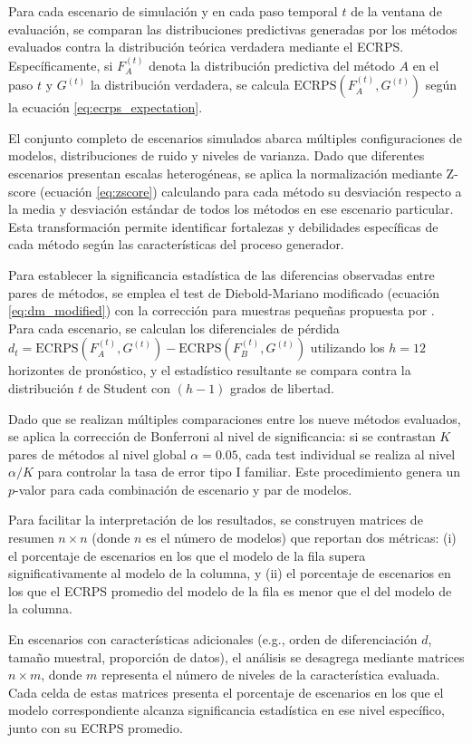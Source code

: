 Para cada escenario de simulación y en cada paso temporal $t$ de la ventana de evaluación, se comparan las distribuciones predictivas generadas por los métodos evaluados contra la distribución teórica verdadera mediante el ECRPS. Específicamente, si $F_A^{(t)}$ denota la distribución predictiva del método $A$ en el paso $t$ y $G^{(t)}$ la distribución verdadera, se calcula $\text{ECRPS}(F_A^{(t)}, G^{(t)})$ según la ecuación \eqref{eq:ecrps_expectation}.

El conjunto completo de escenarios simulados abarca múltiples configuraciones de modelos, distribuciones de ruido y niveles de varianza. Dado que diferentes escenarios presentan escalas heterogéneas, se aplica la normalización mediante Z-score (ecuación \eqref{eq:zscore}) calculando para cada método su desviación respecto a la media y desviación estándar de todos los métodos en ese escenario particular. Esta transformación permite identificar fortalezas y debilidades específicas de cada método según las características del proceso generador.

Para establecer la significancia estadística de las diferencias observadas entre pares de métodos, se emplea el test de Diebold-Mariano modificado (ecuación \eqref{eq:dm_modified}) con la corrección para muestras pequeñas propuesta por \textcite{Harvey1997}. Para cada escenario, se calculan los diferenciales de pérdida $d_t = \text{ECRPS}(F_A^{(t)}, G^{(t)}) - \text{ECRPS}(F_B^{(t)}, G^{(t)})$ utilizando los $h=12$ horizontes de pronóstico, y el estadístico resultante se compara contra la distribución $t$ de Student con $(h-1)$ grados de libertad.

Dado que se realizan múltiples comparaciones entre los nueve métodos evaluados, se aplica la corrección de Bonferroni al nivel de significancia: si se contrastan $K$ pares de métodos al nivel global $\alpha = 0.05$, cada test individual se realiza al nivel $\alpha/K$ para controlar la tasa de error tipo I familiar. Este procedimiento genera un $p$-valor para cada combinación de escenario y par de modelos.

Para facilitar la interpretación de los resultados, se construyen matrices de resumen $n \times n$ (donde $n$ es el número de modelos) que reportan dos métricas: (i) el porcentaje de escenarios en los que el modelo de la fila supera significativamente al modelo de la columna, y (ii) el porcentaje de escenarios en los que el ECRPS promedio del modelo de la fila es menor que el del modelo de la columna. 

En escenarios con características adicionales (e.g., orden de diferenciación $d$, tamaño muestral, proporción de datos), el análisis se desagrega mediante matrices $n \times m$, donde $m$ representa el número de niveles de la característica evaluada. Cada celda de estas matrices presenta el porcentaje de escenarios en los que el modelo correspondiente alcanza significancia estadística en ese nivel específico, junto con su ECRPS promedio.


